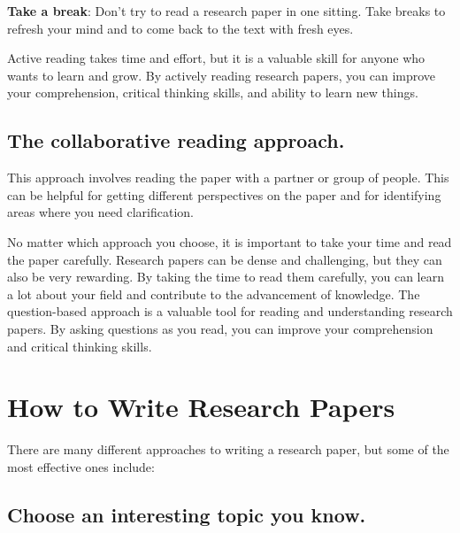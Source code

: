 \documentclass[
  b5paper]{book}
\begin{document}
\textbf{Take a break}: Don't try to read a research paper in one sitting. Take breaks to refresh your mind and to come back to the text with fresh eyes.

Active reading takes time and effort, but it is a valuable skill for anyone who wants to learn and grow. By actively reading research papers, you can improve your comprehension, critical thinking skills, and ability to learn new things.

\hypertarget{the-collaborative-reading-approach.}{%
\subsection*{The collaborative reading approach.}\label{the-collaborative-reading-approach.}}

This approach involves reading the paper with a partner or group of people. This can be helpful for getting different perspectives on the paper and for identifying areas where you need clarification.

No matter which approach you choose, it is important to take your time and read the paper carefully. Research papers can be dense and challenging, but they can also be very rewarding. By taking the time to read them carefully, you can learn a lot about your field and contribute to the advancement of knowledge. The question-based approach is a valuable tool for reading and understanding research papers. By asking questions as you read, you can improve your comprehension and critical thinking skills.

\hypertarget{write}{%
\section{How to Write Research Papers}\label{write}}

There are many different approaches to writing a research paper, but some of the most effective ones include:

\hypertarget{choose-an-interesting-topic-you-know.}{%
\subsection*{Choose an interesting topic you know.}\label{choose-an-interesting-topic-you-know.}}
\end{document}
